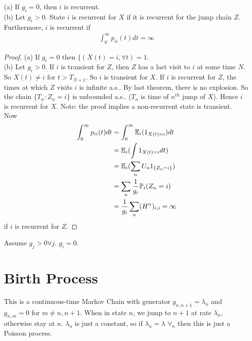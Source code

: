 \documentclass[a4paper]{article}
\begin{document}
\begin{thm}
(a) If $g_i = 0$, then $i$ is recurrent.\\
(b) Let $g_i>0$. State $i$ is recurrent for $X$ if it is recurrent for the jump chain $Z$. Furthermore, $i$ is recurrent if 
\begin{equation*}
\begin{aligned}
\int_0^\infty p_{ii}(t) dt = \infty
\end{aligned}
\end{equation*}
\begin{proof}
(a) If $g_i = 0$ then $\{(X(t) = i, \forall t) = 1$.\\
(b) Let $g_i>0$. If $i$ is transient for $Z$, then $Z$ has a last visit to $i$ at some time $N$. So $X(t) \neq i$ for $t>T_{N+1}$. So $i$ is transient for $X$. If $i$ is recurrent for $Z$, the times at which $Z$ visits $i$ is infinite a.s.. By last theorem, there is no explosion. So the chain $\{T_n:Z_n=i\}$ is unbounded a.s.. ($T_n$ is time of $n^{th}$ jump of $X$). Hence $i$ is recurrent for $X$.
Note: the proof implies a non-recurrent state is transient.\\
Now
\begin{equation*}
\begin{aligned}
\int_0^\infty p_{ii}(t) dt &= \int_0^\infty \mathbb{E}_i(1_{X(t) = i}) dt\\ 
&= \mathbb{E}_i (\int 1_{X(t)=i} dt) \\
&= \mathbb{E}_i(\sum_n U_n 1_{\{Z_n=i\}})\\
&= \sum_n \frac{1}{g_i} \mathbb{P}_i (Z_n = i)\\
&= \frac{1}{g_i} \sum_n (H^n)_{i,i} = \infty
\end{aligned}
\end{equation*}
if $i$ is recurrent for $Z$.
\end{proof}
\end{thm}

Assume $g_j>0 \forall j$. $g_i=0$.

\newpage
\section{Birth Process}
This is a continuous-time Markov Chain with generator $g_{n,n+1} = \lambda_n$ and $g_{n,m} = 0$ for $m \neq n,n+1$. When in state $n$, we jump to $n+1$ at rate $\lambda_n$, otherwise stay at $n$. $\lambda_n$ is just a constant, so if $\lambda_n=\lambda$ $\forall_n$ then this is just a Poisson process.
\end{document}
